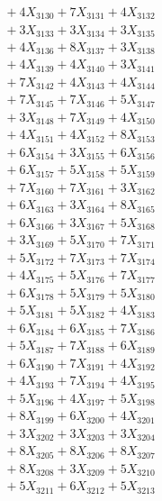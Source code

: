 \documentclass[a4paper,10pt]{article}
\begin{document}
{\begin{align}
&\;  + 4 X_{3130} + 7 X_{3131} + 4 X_{3132} \\[0.3ex]
&\;  + 3 X_{3133} + 3 X_{3134} + 3 X_{3135} \\[0.3ex]
&\;  + 4 X_{3136} + 8 X_{3137} + 3 X_{3138} \\[0.3ex]
&\;  + 4 X_{3139} + 4 X_{3140} + 3 X_{3141} \\[0.3ex]
&\;  + 7 X_{3142} + 4 X_{3143} + 4 X_{3144} \\[0.3ex]
&\;  + 7 X_{3145} + 7 X_{3146} + 5 X_{3147} \\[0.3ex]
&\;  + 3 X_{3148} + 7 X_{3149} + 4 X_{3150} \\[0.3ex]
&\;  + 4 X_{3151} + 4 X_{3152} + 8 X_{3153} \\[0.3ex]
&\;  + 6 X_{3154} + 3 X_{3155} + 6 X_{3156} \\[0.3ex]
&\;  + 6 X_{3157} + 5 X_{3158} + 5 X_{3159} \\[0.5ex]\allowbreak
&\;  + 7 X_{3160} + 7 X_{3161} + 3 X_{3162} \\[0.3ex]
&\;  + 6 X_{3163} + 3 X_{3164} + 8 X_{3165} \\[0.3ex]
&\;  + 6 X_{3166} + 3 X_{3167} + 5 X_{3168} \\[0.3ex]
&\;  + 3 X_{3169} + 5 X_{3170} + 7 X_{3171} \\[0.3ex]
&\;  + 5 X_{3172} + 7 X_{3173} + 7 X_{3174} \\[0.3ex]
&\;  + 4 X_{3175} + 5 X_{3176} + 7 X_{3177} \\[0.3ex]
&\;  + 6 X_{3178} + 5 X_{3179} + 5 X_{3180} \\[0.3ex]
&\;  + 5 X_{3181} + 5 X_{3182} + 4 X_{3183} \\[0.3ex]
&\;  + 6 X_{3184} + 6 X_{3185} + 7 X_{3186} \\[0.3ex]
&\;  + 5 X_{3187} + 7 X_{3188} + 6 X_{3189} \\[0.5ex]\allowbreak
&\;  + 6 X_{3190} + 7 X_{3191} + 4 X_{3192} \\[0.3ex]
&\;  + 4 X_{3193} + 7 X_{3194} + 4 X_{3195} \\[0.3ex]
&\;  + 5 X_{3196} + 4 X_{3197} + 5 X_{3198} \\[0.3ex]
&\;  + 8 X_{3199} + 6 X_{3200} + 4 X_{3201} \\[0.3ex]
&\;  + 3 X_{3202} + 3 X_{3203} + 3 X_{3204} \\[0.3ex]
&\;  + 8 X_{3205} + 8 X_{3206} + 8 X_{3207} \\[0.3ex]
&\;  + 8 X_{3208} + 3 X_{3209} + 5 X_{3210} \\[0.3ex]
&\;  + 5 X_{3211} + 6 X_{3212} + 5 X_{3213} \\[0.3ex]

\end{align}}
\end{document}
